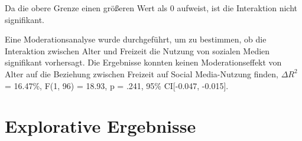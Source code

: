 Da die obere Grenze einen größeren Wert als 0 aufweist, ist die Interaktion nicht signifikant.

Eine Moderationsanalyse wurde durchgeführt, um zu bestimmen, ob die Interaktion zwischen Alter und Freizeit die Nutzung von sozialen Medien signifikant vorhersagt. Die Ergebnisse konnten keinen Moderationseffekt von Alter auf die Beziehung zwischen Freizeit auf Social Media-Nutzung finden, $\Delta R^{2}$ = 16.47\%, F(1, 96) = 18.93, p = .241, 95\% CI[-0.047, -0.015].


\section{Explorative Ergebnisse}    \label{sec_4.3}

